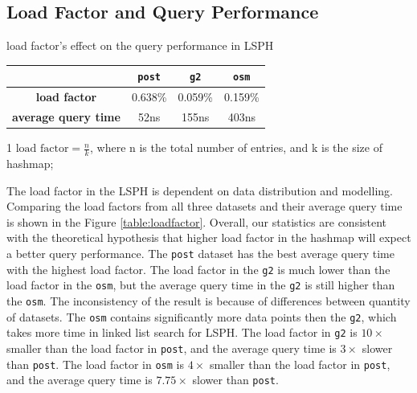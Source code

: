 \subsection{Load Factor and Query Performance}

\begin{center}
\begin{adjustbox}{max width={\textwidth}, max totalheight={\textheight},keepaspectratio}
\begin{threeparttable}
\caption{load factor's effect on the query performance in LSPH}
\begin{tabular}{c|c c c}
    \toprule
                                    &\texttt{post}      & \texttt{g2} & \texttt{osm}             \\ \midrule 
    \textbf{load factor}\tnote{1}            & 0.638\%   & 0.059\%   & 0.159\% \\
    \textbf{average query time}     & 52ns      & 155ns     & 403ns   \\
    \bottomrule
\end{tabular}
\begin{tablenotes}
\item[1] $\text{load factor} = \frac{n}{k}$, where n is the total number of entries, and k is the size of hashmap;
\end{tablenotes}
\end{threeparttable}
\label{table:loadfactor}
\end{adjustbox}
\end{center}

The load factor in the LSPH is dependent on data distribution and modelling. Comparing the load factors from all three datasets and their average query time is shown in the Figure \ref{table:loadfactor}. Overall, our statistics are consistent with the theoretical hypothesis that higher load factor in the hashmap will expect a better query performance. The \texttt{post} dataset has the best average query time with the highest load factor. The load factor in the \texttt{g2} is much lower than the load factor in the \texttt{osm}, but the average query time in the \texttt{g2} is still higher than the \texttt{osm}. The inconsistency of the result is because of differences between quantity of datasets. The \texttt{osm} contains significantly more data points then the \texttt{g2}, which takes more time in linked list search for LSPH. The load factor in \texttt{g2} is $10\times$ smaller than the load factor in \texttt{post}, and the average query time is $3\times$ slower than \texttt{post}. The load factor in \texttt{osm} is $4\times$ smaller than the load factor in \texttt{post}, and the average query time is $7.75\times$ slower than \texttt{post}.

